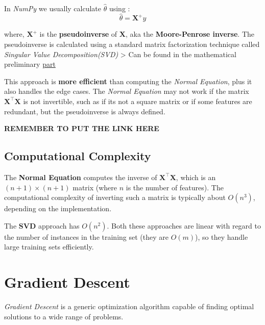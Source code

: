 \documentclass[11pt, a4paper]{book}
\begin{document}
    \begin{center}
    \end{center}
    { \hspace*{\fill} \\}
    
    In \emph{NumPy} we usually calculate \(\hat{\theta}\) using :
\[\hat{\theta} = \mathbf{X}^{+}y\]

where, \(\mathbf{X}^{+}\) is the \textbf{pseudoinverse} of
\(\mathbf{X}\), aka the \textbf{Moore-Penrose inverse}. The
pseudoinverse is calculated using a standard matrix factorization
technique called \emph{Singular Value Decomposition(SVD)} \textgreater{}
Can be found in the mathematical preliminary \href{www.github.com}{part}

This approach is \textbf{more efficient} than computing the \emph{Normal
Equation}, plus it also handles the edge cases. The \emph{Normal
Equation} may not work if the matrix \(\mathbf{X^{\intercal}X}\) is not
invertible, such as if its not a square matrix or if some features are
redundant, but the pseudoinverse is always defined.

\textbf{REMEMBER TO PUT THE LINK HERE}

    \hypertarget{computational-complexity}{%
\subsection{Computational
Complexity}\label{computational-complexity}}

The \textbf{Normal Equation} computes the inverse of
\(\mathbf{X^{\intercal}X}\), which is an \((n + 1) \times (n + 1)\) matrix
(where \(n\) is the number of features). The computational complexity of
inverting such a matrix is typically about \(O(n^3)\), depending on the
implementation.

The \textbf{SVD} approach has \(O(n^2)\). Both these approaches are
linear with regard to the number of instances in the training set (they
are \(O(m)\)), so they handle large training sets efficiently.

    \hypertarget{gradient-descent}{%
\section{Gradient Descent}\label{gradient-descent}}

\emph{Gradient Descent} is a generic optimization algorithm capable of
finding optimal solutions to a wide range of problems.
\end{document}
